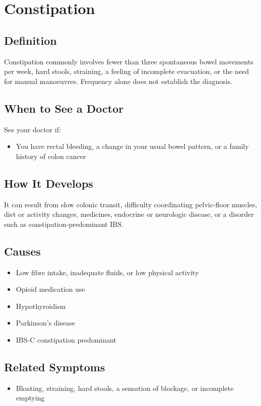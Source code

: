 \chapter{Constipation}

\section*{Definition}
Constipation commonly involves fewer than three spontaneous bowel movements per week, hard stools, straining, a feeling of incomplete evacuation, or the need for manual manoeuvres. Frequency alone does not establish the diagnosis.

\section*{When to See a Doctor}
See your doctor if:
\begin{itemize}
  \item You have rectal bleeding, a change in your usual bowel pattern, or a family history of colon cancer
\end{itemize}

\section*{How It Develops}
It can result from slow colonic transit, difficulty coordinating pelvic-floor muscles, diet or activity changes, medicines, endocrine or neurologic disease, or a disorder such as constipation-predominant IBS.

\section*{Causes}
\begin{itemize}
  \item Low fibre intake, inadequate fluids, or low physical activity
  \item Opioid medication use
  \item Hypothyroidism
  \item Parkinson's disease
  \item IBS-C constipation predominant
\end{itemize}

\section*{Related Symptoms}
\begin{itemize}
  \item Bloating, straining, hard stools, a sensation of blockage, or incomplete emptying
\end{itemize}

